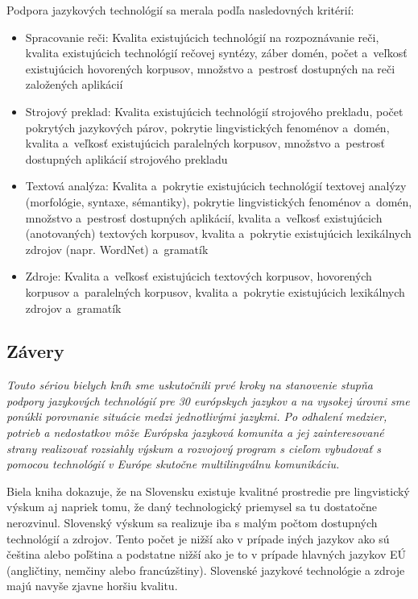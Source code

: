 \begin{multicols}{2}
Podpora jazykových technológií sa merala podľa nasledovných kritérií:

\begin{itemize}
\item Spracovanie reči: Kvalita existujúcich technológií na rozpoznávanie reči, kvalita existujúcich technológií rečovej syntézy, záber domén, počet a~veľkosť existujúcich hovorených korpusov, množstvo a~pestrosť dostupných na reči založených aplikácií
\item Strojový preklad: Kvalita existujúcich technológií strojového prekladu, počet pokrytých jazykových párov, pokrytie lingvistických fenoménov a~domén, kvalita a~veľkosť existujúcich paralelných korpusov, množstvo a~pestrosť dostupných aplikácií strojového prekladu
\item Textová analýza: Kvalita a~pokrytie existujúcich technológií textovej analýzy (morfológie, syntaxe, sémantiky), pokrytie lingvistických fenoménov a~domén, množstvo a~pestrosť dostupných aplikácií, kvalita a~veľkosť existujúcich (anotovaných) textových korpusov, kvalita a~pokrytie existujúcich lexikálnych zdrojov (napr. WordNet) a~gramatík
\item Zdroje: Kvalita a~veľkosť existujúcich textových korpusov, hovorených korpusov a~paralelných korpusov, kvalita a~pokrytie existujúcich lexikálnych zdrojov a~gramatík
\end{itemize} 

\subsection{Závery}
\emph{Touto sériou bielych kníh sme uskutočnili prvé kroky na stanovenie stupňa podpory jazykových technológií pre 30 európskych jazykov a na vysokej úrovni sme ponúkli porovnanie situácie medzi jednotlivými jazykmi. Po odhalení medzier, potrieb a nedostatkov môže Európska jazyková komunita a jej zainteresované strany realizovať rozsiahly výskum a rozvojový program s cieľom vybudovať s pomocou technológií v Európe skutočne multilingválnu komunikáciu.}

Biela kniha dokazuje, že na Slovensku existuje kvalitné prostredie pre
lingvistický výskum aj napriek tomu, že daný technologický priemysel sa tu
dostatočne nerozvinul. Slovenský výskum sa realizuje iba s malým počtom
dostupných technológií a zdrojov. Tento počet je nižší ako v prípade iných
jazykov ako sú čeština alebo poľština a podstatne nižší ako je to v prípade
hlavných jazykov EÚ (angličtiny, nemčiny alebo francúzštiny). Slovenské jazykové
technológie a zdroje majú navyše zjavne horšiu kvalitu.


\end{multicols}
